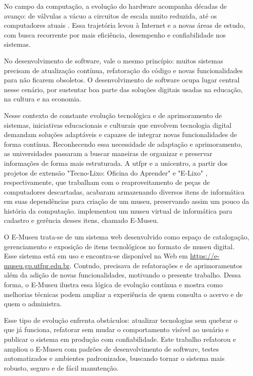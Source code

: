 No campo da computação, a evolução do hardware acompanha décadas de avanço: de válvulas a vácuo a circuitos de escala muito reduzida, até os computadores atuais \cite{eniac}. Essa trajetória levou à Internet e a novas áreas de estudo, com busca recorrente por mais eficiência, desempenho e confiabilidade nos sistemas.

No desenvolvimento de software, vale o mesmo princípio: muitos sistemas precisam de atualização contínua, refatoração do código e novas funcionalidades para não ficarem obsoletos. O desenvolvimento de software ocupa lugar central nesse cenário, por sustentar boa parte das soluções digitais usadas na educação, na cultura e na economia.

Nesse contexto de constante evolução tecnológica e de aprimoramento de sistemas, iniciativas educacionais e culturais que envolvem tecnologia digital demandam soluções adaptáveis e capazes de integrar novas funcionalidades de forma contínua. Reconhecendo essa necessidade de adaptação e aprimoramento, as universidades passaram a buscar maneiras de organizar e preservar informações de forma mais estruturada. A \acrfull{utfpr} e a \acrfull{unicentro}, a partir dos projetos de extensão "Tecno-Lixo: Oficina do Aprender" \cite{ribeiro2024tecno} e "E-Lixo" \cite{re2021cartilha}, respectivamente, que trabalham com o reaproveitamento de peças de computadores descartadas, acabaram armazenando diversos itens de informática em suas dependências para criação de um museu, preservando assim um pouco da história da computação.  implementou um museu virtual de informática para cadastro e gerência desses itens, chamado E-Museu.

O E-Museu trata-se de um sistema web desenvolvido como espaço de catalogação, gerenciamento e exposição de itens tecnológicos no formato de museu digital. Esse sistema está em uso e encontra-se disponível na Web em \url{https://e-museu.gp.utfpr.edu.br}. Contudo, precisava de refatorações e de aprimoramentos além da adição de novas funcionalidades, motivando o presente trabalho. 
Dessa forma, o E-Museu ilustra essa lógica de evolução contínua e mostra como melhorias técnicas podem ampliar a experiência de quem consulta o acervo e de quem o administra.


Esse tipo de evolução enfrenta obstáculos: atualizar tecnologias sem quebrar o que já funciona, refatorar sem mudar o comportamento visível ao usuário e publicar o sistema em produção com confiabilidade. Este trabalho refatorou e ampliou o E-Museu com padrões de desenvolvimento de software, testes automatizados e ambientes padronizados, buscando tornar o sistema mais robusto, seguro e de fácil manutenção.



